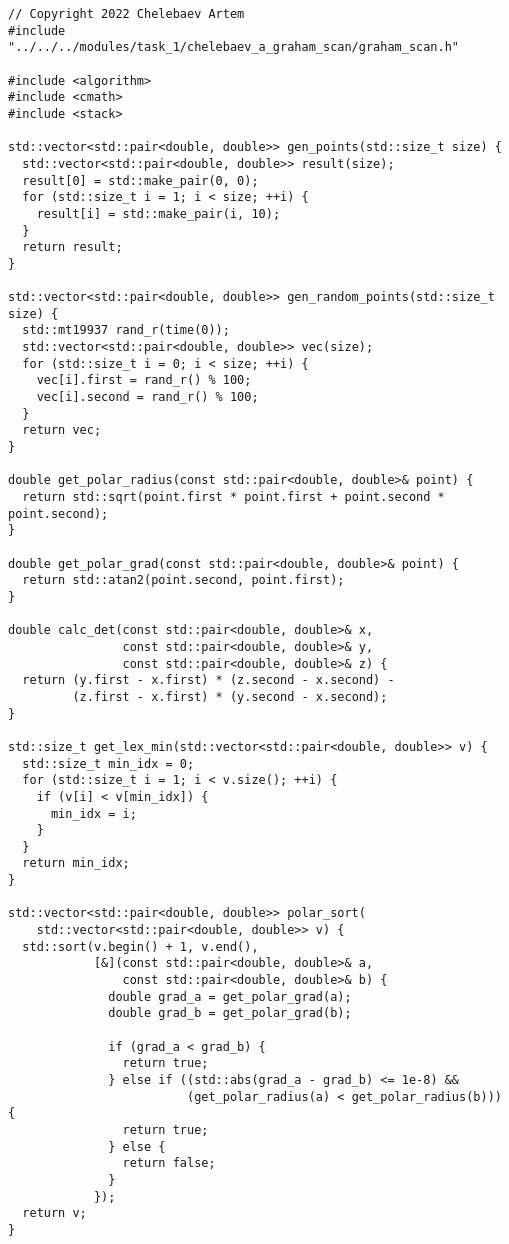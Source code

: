 \documentclass{report}
\begin{document}
\begin{lstlisting}
// Copyright 2022 Chelebaev Artem
#include "../../../modules/task_1/chelebaev_a_graham_scan/graham_scan.h"

#include <algorithm>
#include <cmath>
#include <stack>

std::vector<std::pair<double, double>> gen_points(std::size_t size) {
  std::vector<std::pair<double, double>> result(size);
  result[0] = std::make_pair(0, 0);
  for (std::size_t i = 1; i < size; ++i) {
    result[i] = std::make_pair(i, 10);
  }
  return result;
}

std::vector<std::pair<double, double>> gen_random_points(std::size_t size) {
  std::mt19937 rand_r(time(0));
  std::vector<std::pair<double, double>> vec(size);
  for (std::size_t i = 0; i < size; ++i) {
    vec[i].first = rand_r() % 100;
    vec[i].second = rand_r() % 100;
  }
  return vec;
}

double get_polar_radius(const std::pair<double, double>& point) {
  return std::sqrt(point.first * point.first + point.second * point.second);
}

double get_polar_grad(const std::pair<double, double>& point) {
  return std::atan2(point.second, point.first);
}

double calc_det(const std::pair<double, double>& x,
                const std::pair<double, double>& y,
                const std::pair<double, double>& z) {
  return (y.first - x.first) * (z.second - x.second) -
         (z.first - x.first) * (y.second - x.second);
}

std::size_t get_lex_min(std::vector<std::pair<double, double>> v) {
  std::size_t min_idx = 0;
  for (std::size_t i = 1; i < v.size(); ++i) {
    if (v[i] < v[min_idx]) {
      min_idx = i;
    }
  }
  return min_idx;
}

std::vector<std::pair<double, double>> polar_sort(
    std::vector<std::pair<double, double>> v) {
  std::sort(v.begin() + 1, v.end(),
            [&](const std::pair<double, double>& a,
                const std::pair<double, double>& b) {
              double grad_a = get_polar_grad(a);
              double grad_b = get_polar_grad(b);

              if (grad_a < grad_b) {
                return true;
              } else if ((std::abs(grad_a - grad_b) <= 1e-8) &&
                         (get_polar_radius(a) < get_polar_radius(b))) {
                return true;
              } else {
                return false;
              }
            });
  return v;
}


\end{lstlisting}
\end{document}
